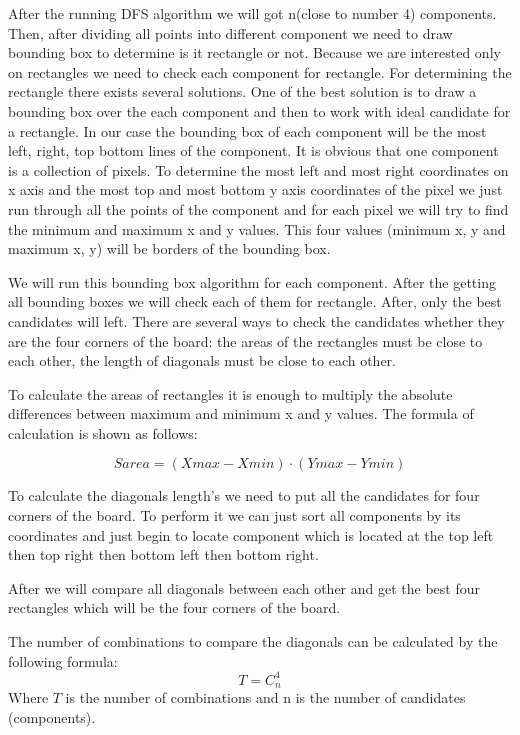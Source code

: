 After the running DFS algorithm we will got n(close to number 4) components. Then, after dividing all points into different component we need to draw bounding box to determine is it rectangle or not. Because we are interested only on rectangles we need to check each component for rectangle. For determining the rectangle there exists several solutions. One of the best solution is to draw a bounding box over the each component and then to work with ideal candidate for a rectangle. In our case the bounding box of each component will be the most left, right, top bottom lines of the component. It is obvious that one component is a collection of pixels. To determine the most left and most right coordinates on x axis and the most top and most bottom y axis coordinates of the pixel we just run through all the points of the component and for each pixel we will try to find the minimum and maximum x and y values. This four values (minimum x, y and maximum x, y) will be borders of the bounding box. 

We will run this bounding box algorithm for each component. After the getting all bounding boxes we will check each of them for rectangle. After, only the best candidates will left. There are several ways to check the candidates whether they are the four corners of the board: the areas of the rectangles must be close to each other, the length of diagonals must be close to each other.

To calculate the areas of rectangles it is enough to multiply the absolute differences between maximum and minimum x and y values. The formula of calculation is shown as follows:

\begin{equation}
    Sarea = (Xmax - Xmin) \cdot (Ymax - Ymin)
\end{equation}

To calculate the diagonals length’s we need to put all the candidates for four corners of the board. To perform it we can just sort all components by its coordinates and just begin to locate component which is located at the top left then top right then bottom left then bottom right.

After we will compare all diagonals between each other and get the best four rectangles which will be the four corners of the board.

The number of combinations to compare the diagonals can be calculated by the following formula: 
\begin{equation}
    T = C_n^4
\end{equation}
Where $T$ is the number of combinations and n is the number of candidates (components). 

